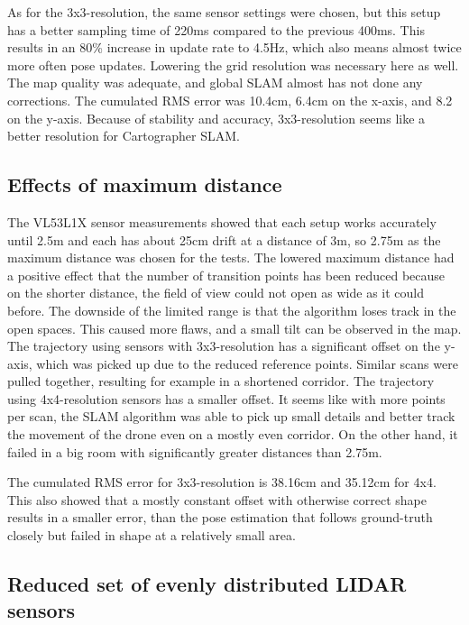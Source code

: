 \documentclass[conference]{IEEEtran}
\begin{document}
As for the 3x3-resolution, the same sensor settings were chosen, but this setup has a better sampling time of 
220ms compared to the previous 400ms. This results in an 80\% increase in update rate to 4.5Hz, which also 
means almost twice more often pose updates. Lowering the grid resolution was necessary here as well. The map 
quality was adequate, and global SLAM almost has not done any corrections. The cumulated RMS error was 10.4cm, 
6.4cm on the x-axis, and 8.2 on the y-axis. Because of stability and accuracy, 3x3-resolution seems like a 
better resolution for Cartographer SLAM. 

\subsection{Effects of maximum distance}

The VL53L1X sensor measurements showed that each setup works accurately until 2.5m and each has about 25cm 
drift at a distance of 3m, so 2.75m as the maximum distance was chosen for the tests. The lowered maximum 
distance had a positive effect that the number of transition points has been reduced because on the shorter 
distance, the field of view could not open as wide as it could before. The downside of the limited range is 
that the algorithm loses track in the open spaces. This caused more flaws, and a small tilt can be observed
in the map.  
The trajectory using sensors with 3x3-resolution has a significant offset on the y-axis, which was picked up 
due to the reduced reference points. Similar scans were pulled together, resulting for example in a shortened
corridor. 
The trajectory using 4x4-resolution sensors has a smaller offset. It seems like with more 
points per scan, the SLAM algorithm was able to pick up small details and better track the movement of the 
drone even on a mostly even corridor. On the other hand, it failed in a big room with significantly greater 
distances than 2.75m.

The cumulated RMS error for 3x3-resolution is 38.16cm and 35.12cm for 4x4. This also showed that a mostly
constant offset with otherwise correct shape results in a smaller error, than the pose estimation that 
follows ground-truth closely but failed in shape at a relatively small area. 

\subsection{Reduced set of evenly distributed LIDAR sensors}
\end{document}
